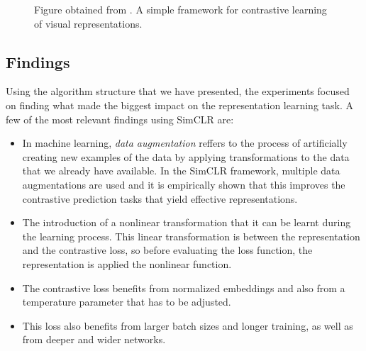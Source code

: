 \begin{figure}[H]
    \small
        \centering
        \caption{Figure obtained from \cite{chen_simple_2020}. A simple framework for contrastive learning of visual representations.}
        \label{fig:framework}
    \end{figure}

    \subsection*{Findings}

    Using the algorithm structure that we have presented, the experiments focused on finding what made the biggest impact on the representation learning task. A few of the most relevant findings using SimCLR are: 
    \begin{itemize}
    \item In machine learning, \emph{data augmentation} reffers to the process of artificially creating new examples of the data by applying transformations to the data that we already have available. In the SimCLR framework, multiple data augmentations are used and it is empirically shown that this improves the contrastive prediction tasks that yield effective representations.
    
    \item The introduction of a nonlinear transformation that it can be learnt during the learning process. This linear transformation is between the representation and the contrastive loss, so before evaluating the loss function, the representation is applied the nonlinear function.
    
    \item The contrastive loss benefits from normalized embeddings and also from a temperature parameter that has to be adjusted.
    
    \item This loss also benefits from larger batch sizes and longer training, as well as from deeper and wider networks.
    \end{itemize}